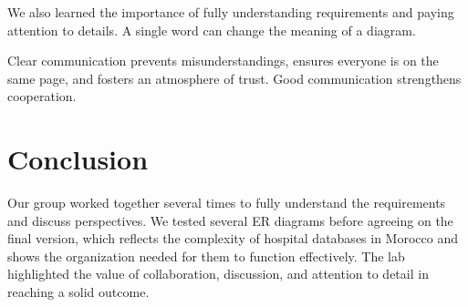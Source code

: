 \documentclass[a4paper,12pt]{article}
\begin{document}
We also learned the importance of fully understanding requirements and paying attention to details. A single word can change the meaning of a diagram.

Clear communication prevents misunderstandings, ensures everyone is on the same page, and fosters an atmosphere of trust. Good communication strengthens cooperation.

\section{Conclusion}
Our group worked together several times to fully understand the requirements and discuss perspectives. We tested several ER diagrams before agreeing on the final version, which reflects the complexity of hospital databases in Morocco and shows the organization needed for them to function effectively. The lab highlighted the value of collaboration, discussion, and attention to detail in reaching a solid outcome.
\end{document}
